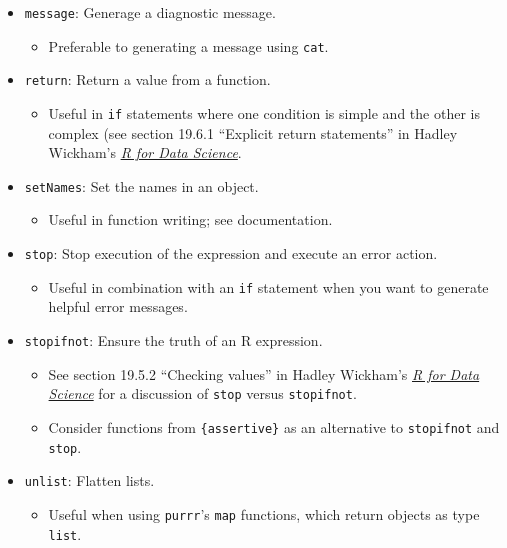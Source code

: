 \documentclass[
]{book}
\providecommand{\tightlist}{%
  \setlength{\itemsep}{0pt}\setlength{\parskip}{0pt}}
\begin{document}
\begin{itemize}
\tightlist
\item
  \texttt{message}: Generage a diagnostic message.

  \begin{itemize}
  \tightlist
  \item
    Preferable to generating a message using \texttt{cat}.
  \end{itemize}
\item
  \texttt{return}: Return a value from a function.

  \begin{itemize}
  \tightlist
  \item
    Useful in \texttt{if} statements where one condition is simple and the other is complex (see section 19.6.1 ``Explicit return statements'' in Hadley Wickham's \href{https://r4ds.had.co.nz/functions.html}{\emph{R for Data Science}}.
  \end{itemize}
\item
  \texttt{setNames}: Set the names in an object.

  \begin{itemize}
  \tightlist
  \item
    Useful in function writing; see documentation.
  \end{itemize}
\item
  \texttt{stop}: Stop execution of the expression and execute an error action.

  \begin{itemize}
  \tightlist
  \item
    Useful in combination with an \texttt{if} statement when you want to generate helpful error messages.
  \end{itemize}
\item
  \texttt{stopifnot}: Ensure the truth of an R expression.

  \begin{itemize}
  \tightlist
  \item
    See section 19.5.2 ``Checking values'' in Hadley Wickham's \href{https://r4ds.had.co.nz/functions.html}{\emph{R for Data Science}} for a discussion of \texttt{stop} versus \texttt{stopifnot}.
  \item
    Consider functions from \texttt{\{assertive\}} as an alternative to \texttt{stopifnot} and \texttt{stop}.
  \end{itemize}
\item
  \texttt{unlist}: Flatten lists.

  \begin{itemize}
  \tightlist
  \item
    Useful when using \texttt{purrr}'s \texttt{map} functions, which return objects as type \texttt{list}.
  \end{itemize}
\end{itemize}
\end{document}
